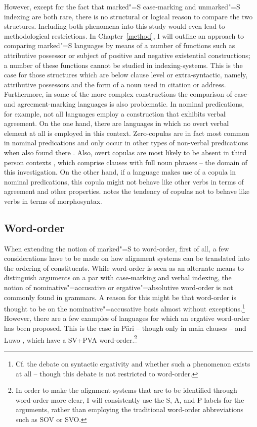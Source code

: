 However, except for the fact that marked"=S case-marking and unmarked"=S indexing are both rare, there is no structural or logical reason to compare the two structures. 
Including both phenomena into this study would even lead to methodological restrictions.
In Chapter~\ref{method}, I will outline an approach to comparing marked"=S languages by means of a number of functions such as attributive possessor or subject of positive and negative existential constructions; a number of these functions cannot be studied in indexing-systems.
This is the case for those structures which are below clause level or extra-syntactic, namely, attributive possessors and the form of a noun used in citation or address. 
Furthermore, in some of the more complex constructions the comparison of case- and agreement-marking languages is also problematic. 
In nominal predications, for example, not all languages employ a construction that exhibits verbal agreement. 
On the one hand, there are languages in which no overt verbal element at all is employed in this context. 
Zero-copulas are in fact most common in nominal predications and only occur in other types of non-verbal predications when also found there \citep[62--65]{Stassen:1997}. 
Also, overt copulas are most likely to be absent in third person contexts \citep[65]{Stassen:1997}, which comprise clauses with full noun phrases -- the domain of this investigation.
On the other hand, if a language makes use of a copula in nominal predications, this copula might not behave like other verbs in terms of agreement and other properties. \citet{Pustet:2003} notes the tendency of copulas not to behave like verbs in terms of morphosyntax. 

\subsection{Word-order}\label{order}  

When extending the notion of marked"=S to word-order, first of all, a few considerations have to be made on how alignment systems can be translated into the ordering of constituents.
While word-order is seen as an alternate means to distinguish arguments on a par with case-marking and verbal indexing, the notion of nominative"=accusative or ergative"=absolutive word-order is not commonly found in grammars.
A reason for this might be that word-order is thought to be on the nominative"=accusative basis almost without exceptions.\footnote{Cf. the debate on syntactic ergativity \citep{Anderson:1976,Anderson:1977, Dixon:1994} and whether such a phenomenon exists at all -- though this debate is not restricted to word-order.}
However, there are a few examples of languages for which an ergative word-order has been proposed.
This is the case in P\"ari \citep{Andersen:1988} -- though only in main clauses -- and Luwo \citep{Buth:1981}, which have a SV+PVA word-order.\footnote{In order to make the alignment systems that are to be identified through word-order more clear, I will consistently use the S, A, and P labels for the arguments, rather than employing the traditional word-order abbreviations such as SOV or SVO.} 

